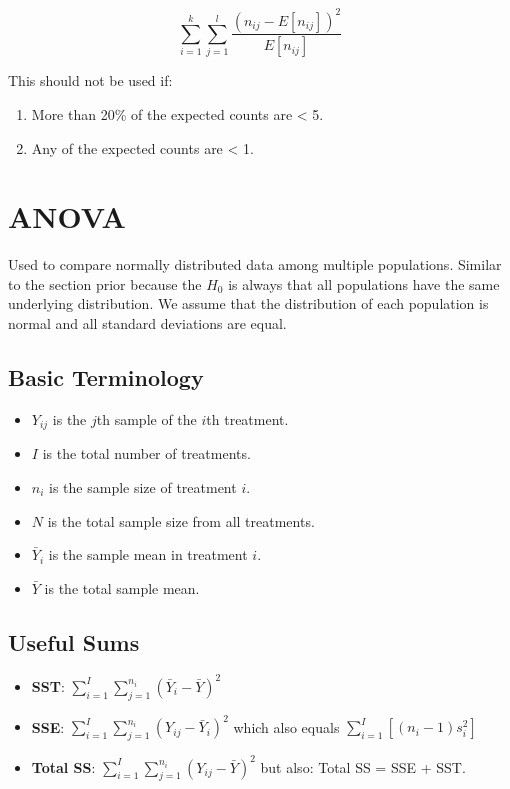 \documentclass{article}
\begin{document}
\begin{equation}
  \sum_{i=1}^{k}\sum_{j=1}^{l}\frac{(n_{ij} - E[n_{ij}])^2}{E[n_{ij}]}
\end{equation}

This should not be used if:
\begin{enumerate}
  \item More than 20\% of the expected counts are < 5.
  \item Any of the expected counts are < 1.
\end{enumerate}

\section{ANOVA}
Used to compare normally distributed data among multiple populations. Similar
to the section prior because the $H_0$ is always that all populations have the
same underlying distribution. We assume that the distribution of each
population is normal and all standard deviations are equal.

\subsection{Basic Terminology}
\begin{itemize}
  \item $Y_{ij}$ is the $j$th sample of the $i$th treatment.
  \item $I$ is the total number of treatments.
  \item $n_i$ is the sample size of treatment $i$.
  \item $N$ is the total sample size from all treatments.
  \item $\bar{Y}_i$ is the sample mean in treatment $i$.
  \item $\bar{Y}$ is the total sample mean.
\end{itemize}

\subsection{Useful Sums}
\begin{itemize}
  \item \textbf{SST}: $\sum_{i=1}^{I}\sum_{j=1}^{n_i}(\bar{Y}_i-\bar{Y})^2$
  \item \textbf{SSE}: $\sum_{i=1}^I\sum_{j=1}^{n_i}(Y_{ij} - \bar{Y}_i)^2$
    which also equals $\sum_{i=1}^I[(n_i - 1)s_i^2]$
  \item \textbf{Total SS}: $\sum_{i=1}^{I}\sum_{j=1}^{n_i}(Y_{ij}-\bar{Y})^2$
    but also: Total SS = SSE + SST.
\end{itemize}
\end{document}
